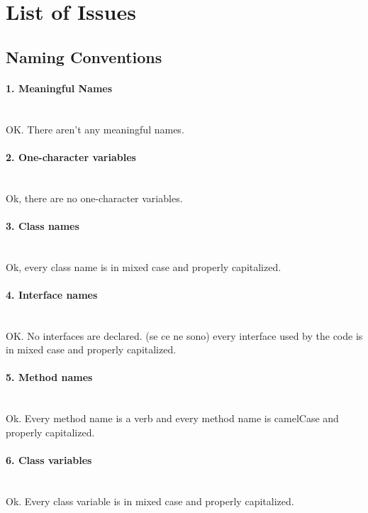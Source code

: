\documentclass[english]{article}
\begin{document}
\section{List of Issues} %

\subsection{Naming Conventions}

\paragraph{1. Meaningful Names}\\
OK. There aren't any meaningful names.

\paragraph{2. One-character variables}\\
Ok, there are no one-character variables.

\paragraph{3. Class names}\\
Ok, every class name is in mixed case and properly capitalized.

\paragraph{4. Interface names}\\
OK. No interfaces are declared.
(se ce ne sono) every interface used by the code is in mixed case and properly capitalized.

\paragraph{5. Method names}\\
Ok. Every method name is a verb and every method name is camelCase and properly capitalized.

\paragraph{6. Class variables}\\
Ok. Every class variable is in mixed case and properly capitalized.
\end{document}
